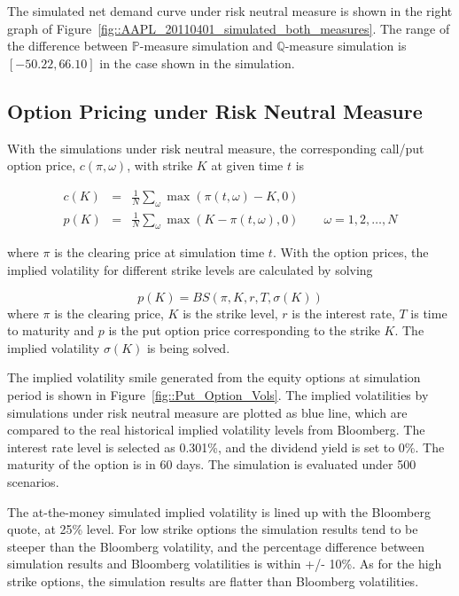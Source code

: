 \documentclass{article}
\begin{document}
The simulated net demand curve under risk neutral measure is shown in the right graph of Figure~\ref{fig::AAPL_20110401_simulated_both_measures}. The range of the difference between $\mathbb{P}$-measure simulation and $\mathbb{Q}$-measure simulation is $[-50.22, 66.10]$ in the case shown in the simulation. 


\subsection{Option Pricing under Risk Neutral Measure}
With the simulations under risk neutral measure, the corresponding call/put option price, $c(\pi, \omega)$, with strike $K$ at given time $t$ is

\begin{eqnarray*}
c(K) &=& \frac{1}{N} \sum_{\omega} \max\left(\pi(t,\omega)-K,0\right) \\
p(K) &=& \frac{1}{N} \sum_{\omega} \max\left(K - \pi(t,\omega),0\right) \qquad \omega = 1,2,\ldots,N
\end{eqnarray*}

where $\pi$ is the clearing price at simulation time $t$. With the option prices, the implied volatility for different strike levels are calculated by solving

$$
p(K) = BS(\pi,K,r,T,\sigma(K))
$$
where $\pi$ is the clearing price, $K$ is the strike level, $r$ is the interest rate, $T$ is time to maturity and $p$ is the put option price corresponding to the strike $K$.
The implied volatility $\sigma(K)$ is being solved.

The implied volatility smile generated from the equity options at simulation period is shown in Figure~\ref{fig::Put_Option_Vols}.
The implied volatilities by simulations under risk neutral measure are plotted as blue line, which are compared to the real historical implied volatility levels from Bloomberg. The interest rate level is selected as 0.301\%, and the dividend yield is set to 0\%. The maturity of the option is in 60 days. The simulation is evaluated under 500 scenarios.

The at-the-money simulated implied volatility is lined up with the Bloomberg quote, at 25\% level. For low strike options the simulation results tend to be steeper than the Bloomberg volatility, and the percentage difference between simulation results and Bloomberg volatilities is within +/- 10\%. As for the high strike options, the simulation results are flatter than Bloomberg volatilities.
\end{document}
